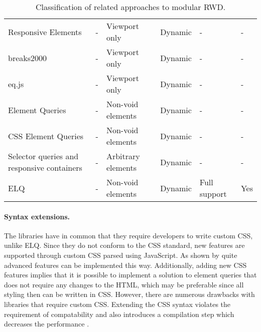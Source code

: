 \documentclass{llncs}
\newcommand{\elq}{ELQ}
\begin{document}
\begin{table*}[ht!]
\begin{tabular}[t]{ p{3cm} l l l l l }
       Responsive Elements \cite{eq_imp_responsive-elements-2}    &                                 - &   Viewport only &                 Dynamic &    -                  & -  \\
       breaks2000 \cite{eq_imp_breaks2000}                        &                                 - &   Viewport only &                 Dynamic &    -                  & -  \\
       eq.js \cite{eq_imp_eqjs}                                   &                                 - &   Viewport only &                 Dynamic &    -                  & -  \\
       Element Queries \cite{eq_imp_element-queries}              &                                 - &   Non-void elements &             Dynamic &    -                  & -  \\
       CSS Element Queries \cite{eq_imp_css-element-queries}      &                                 - &   Non-void elements &             Dynamic &    -                  & -  \\
       Selector queries and responsive containers \cite{eq_imp_selector_queries}                  & - &   Arbitrary elements &            Dynamic &    -                  & -  \\
       \elq{}                                                                                     & - &   Non-void elements &             Dynamic &    Full support       & Yes \\
    \end{tabular}
    \vspace{.5cm}
    \caption{Classification of related approaches to modular RWD.}
    \label{table:approaches-classifications}
  \end{table*}

  \paragraph{Syntax extensions.}
  The libraries \cite{eq_imp_magichtml,eq_imp_eqcss,eq_imp_prollyfill-min-width,eq_imp_localised-css,eq_imp_gss} have in common that they require developers to write custom CSS, unlike \elq{}.
  Since they do not conform to the CSS standard, new features are supported through custom CSS parsed using JavaScript.
  As shown by \cite{eq_imp_eqcss,eq_imp_gss} quite advanced features can be implemented this way.
  Additionally, adding new CSS features implies that it is possible to implement a solution to element queries that does not require any changes to the HTML, which may be preferable since all styling then can be written in CSS.
  However, there are numerous drawbacks with libraries that require custom CSS.
  Extending the CSS syntax violates the requirement of compatability and also introduces a compilation step which decreases the performance \cite{elq-thesis}.
\end{document}
